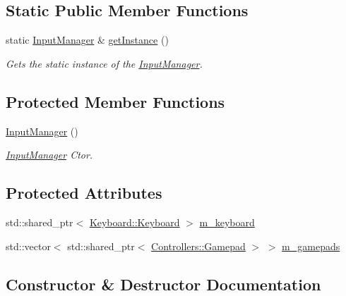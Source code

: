 \subsection*{Static Public Member Functions}
\begin{DoxyCompactItemize}
\item 
static \hyperlink{class_cookie_eng_1_1_input_1_1_input_manager}{Input\+Manager} \& \hyperlink{class_cookie_eng_1_1_input_1_1_input_manager_a0ae972a3fda8747b2b9cc6bb9417dfa8}{get\+Instance} ()
\begin{DoxyCompactList}\small\item\em Gets the static instance of the \hyperlink{class_cookie_eng_1_1_input_1_1_input_manager}{Input\+Manager}. \end{DoxyCompactList}\end{DoxyCompactItemize}
\subsection*{Protected Member Functions}
\begin{DoxyCompactItemize}
\item 
\hyperlink{class_cookie_eng_1_1_input_1_1_input_manager_a6464eabb341068379430b90ec922047a}{Input\+Manager} ()
\begin{DoxyCompactList}\small\item\em \hyperlink{class_cookie_eng_1_1_input_1_1_input_manager}{Input\+Manager} Ctor. \end{DoxyCompactList}\end{DoxyCompactItemize}
\subsection*{Protected Attributes}
\begin{DoxyCompactItemize}
\item 
std\+::shared\+\_\+ptr$<$ \hyperlink{class_cookie_eng_1_1_input_1_1_keyboard_1_1_keyboard}{Keyboard\+::\+Keyboard} $>$ \hyperlink{class_cookie_eng_1_1_input_1_1_input_manager_aa8137e98a8515c6da82cd3ca4f2f04bf}{m\+\_\+keyboard}
\item 
std\+::vector$<$ std\+::shared\+\_\+ptr$<$ \hyperlink{class_cookie_eng_1_1_input_1_1_controllers_1_1_gamepad}{Controllers\+::\+Gamepad} $>$ $>$ \hyperlink{class_cookie_eng_1_1_input_1_1_input_manager_ae0b4f61fc7337f58498b9d6eda637384}{m\+\_\+gamepads}
\end{DoxyCompactItemize}


\subsection{Constructor \& Destructor Documentation}
\mbox{\label{class_cookie_eng_1_1_input_1_1_input_manager_a6464eabb341068379430b90ec922047a}} 

